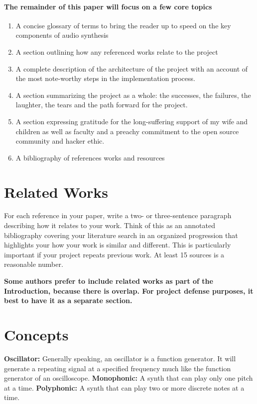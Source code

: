 \documentclass[acmlarge,screen]{acmart}
\begin{document}
	\paragraph{The remainder of this paper will focus on a few core topics}
	\begin{enumerate}
		\item A concise glossary of terms to bring the reader up to speed on the key components of audio synthesis
		\item A section outlining how any referenced works relate to the project
		\item A complete description of the architecture of the project with an account of the most note-worthy steps in the implementation process. 
		\item A section summarizing the project as a whole: the successes, the failures, the laughter, the tears and the path forward for the project.
		\item A section expressing gratitude for the long-suffering support of my wife and children as well as faculty and a preachy commitment to the open source community and hacker ethic.
		\item A bibliography of references works and resources
	\end{enumerate}

\section{Related Works}
For each reference in your paper, write a two- or three-sentence paragraph 
describing how it relates to your work. Think of this as an annotated bibliography
covering your literature search in an organized progression that highlights your 
how your work is similar and different. This is particularly important if your project repeats
previous work. At least 15 sources is a reasonable number.

\textbf{Some authors prefer to include related works as part of the Introduction, because there
is overlap. For project defense purposes, it best to have it as a separate section.}

\section{Concepts}
	\textbf{Oscillator:} Generally speaking, an oscillator is a function generator. It will generate a repeating signal at a specified frequency much like the function generator of an oscilloscope.
	\textbf{Monophonic:} A synth that can play only one pitch at a time.
	\textbf{Polyphonic:} A synth that can play two or more discrete notes at a time.
\end{document}
